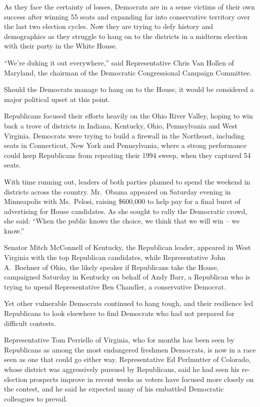 ﻿\documentclass[12pt]{article}
\begin{document}
As they face the certainty of losses, Democrats are in a sense victims of their own success after
winning 55 seats and expanding far into conservative territory over the last two election cycles.
Now they are trying to defy history and demographics as they struggle to hang on to the districts in
a midterm election with their party in the White House.

``We're duking it out everywhere,'' said Representative Chris Van Hollen of Maryland, the chairman
of the Democratic Congressional Campaign Committee.

Should the Democrats manage to hang on to the House, it would be considered a major political upset
at this point.

Republicans focused their efforts heavily on the Ohio River Valley, hoping to win back a trove of
districts in Indiana, Kentucky, Ohio, Pennsylvania and West Virginia. Democrats were trying to build
a firewall in the Northeast, including seats in Connecticut, New York and Pennsylvania, where a
strong performance could keep Republicans from repeating their 1994 sweep, when they captured 54
seats.

With time running out, leaders of both parties planned to spend the weekend in districts across the
country. Mr.~Obama appeared on Saturday evening in Minneapolis with Ms.~Pelosi, raising \$600,000 to
help pay for a final burst of advertising for House candidates. As she sought to rally the
Democratic crowd, she said: ``When the public knows the choice, we think that we will win -- we
know.''

Senator Mitch McConnell of Kentucky, the Republican leader, appeared in West Virginia with the top
Republican candidates, while Representative John A.~Boehner of Ohio, the likely speaker if
Republicans take the House, campaigned Saturday in Kentucky on behalf of Andy Barr, a Republican who
is trying to upend Representative Ben Chandler, a conservative Democrat.

Yet other vulnerable Democrats continued to hang tough, and their resilience led Republicans to look
elsewhere to find Democrats who had not prepared for difficult contests.

Representative Tom Perriello of Virginia, who for months has been seen by Republicans as among the
most endangered freshmen Democrats, is now in a race seen as one that could go either way.
Representative Ed Perlmutter of Colorado, whose district was aggressively pursued by Republicans,
said he had seen his re-election prospects improve in recent weeks as voters have focused more
closely on the contest, and he said he expected many of his embattled Democratic colleagues to
prevail.
\end{document}
